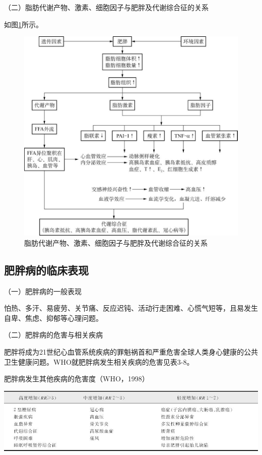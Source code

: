 （二）脂肪代谢产物、激素、细胞因子与肥胖及代谢综合征的关系

如图\ref{fig3-1}所示。

\begin{figure}[!htbp]
 \centering
 \includegraphics{./images/Image00023.jpg}
 \captionsetup{justification=centering}
 \caption{脂肪代谢产物、激素、细胞因子与肥胖及代谢综合征的关系}
 \label{fig3-1}
  \end{figure} 

\hypertarget{text00004.htmlux5cux23mllj16}{%
\subsection{肥胖病的临床表现}\label{text00004.htmlux5cux23mllj16}}

（一）肥胖病的一般表现

怕热、多汗、易疲劳、关节痛、反应迟钝、活动行走困难、心慌气短等，且易发生自卑、焦虑、抑郁等心理问题。

（二）肥胖病的危害与相关疾病

肥胖将成为21世纪心血管系统疾病的罪魁祸首和严重危害全球人类身心健康的公共卫生健康问题。WHO就肥胖病发生相关疾病的危害见表3-8。

\begin{table}[htbp]
\centering
\caption{肥胖病发生其他疾病的危害度（WHO，1998）}
\label{tab3-8}
\includegraphics{./images/Image00024.jpg}
\end{table}

